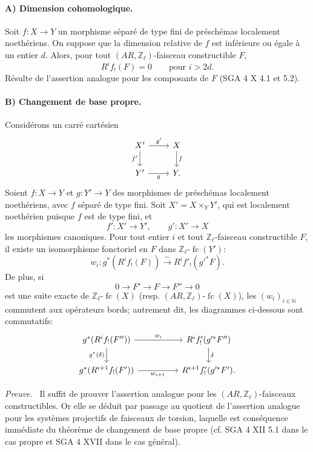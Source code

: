 \documentclass[11pt]{article}
\newenvironment{prooftext}[1][Proof]{\par\noindent\emph{#1.}\ }{\par\medskip}
\providecommand{\fc}{\operatorname{fc}}
\begin{document}
\paragraph{A) Dimension cohomologique.}
Soit \(f:X\to Y\) un morphisme séparé de type fini de préschémas localement noethériens. On suppose que la dimension relative de \(f\) est inférieure ou égale à un entier \(d\). Alors, pour tout \((AR,\mathbb Z_\ell)\)-faisceau constructible \(F\),
\[
R^if_!(F)=0\qquad\text{pour }i>2d.
\]
Résulte de l'assertion analogue pour les composants de \(F\) (SGA 4 X 4.1 et 5.2).

\paragraph{B) Changement de base propre.}
Considérons un carré cartésien
\[
\begin{tikzcd}
X' \arrow[r,"g'"] \arrow[d,"f'"'] & X \arrow[d,"f"]\\
Y' \arrow[r,"g"'] & Y .
\end{tikzcd}
\]
Soient \(f:X\to Y\) et \(g:Y'\to Y\) des morphismes de préschémas localement noethériens, avec \(f\) séparé de type fini. Soit \(X'=X\times_Y Y'\), qui est localement noethérien puisque \(f\) est de type fini, et
\[
f':X'\to Y',\qquad g':X'\to X
\]
les morphismes canoniques. Pour tout entier \(i\) et tout \(\mathbb Z_\ell\)-faisceau constructible \(F\), il existe un isomorphisme fonctoriel en \(F\) dans \(\mathbb Z_\ell\text{-}\fc(Y')\):
\[
w_i:g^*(R^if_!(F))\xrightarrow{\sim} R^if'_!(g'^*F).
\]
De plus, si
\[
0\longrightarrow F'\longrightarrow F\longrightarrow F''\longrightarrow 0
\]
est une suite exacte de \(\mathbb Z_\ell\text{-}\fc(X)\) (resp. \((AR,\mathbb Z_\ell)\text{-}\fc(X)\)), les \((w_i)_{i\in\mathbb N}\) commutent aux opérateurs bords; autrement dit, les diagrammes ci-dessous sont commutatifs:
\[
\begin{tikzcd}[column sep=huge]
g^*(R^if_!(F'')) \arrow[r,"w_i"] \arrow[d,"g^*(\delta)"']
&
R^if'_!(g'^*F'') \arrow[d,"\delta"]\\
g^*(R^{i+1}f_!(F')) \arrow[r,"w_{i+1}"']
&
R^{i+1}f'_!(g'^*F').
\end{tikzcd}
\]

\begin{prooftext}[Preuve]
Il suffit de prouver l'assertion analogue pour les \((AR,\mathbb Z_\ell)\)-faisceaux constructibles. Or elle se déduit par passage au quotient de l'assertion analogue pour les systèmes projectifs de faisceaux de torsion, laquelle est conséquence immédiate du théorème de changement de base propre (cf. SGA 4 XII 5.1 dans le cas propre et SGA 4 XVII dans le cas général).
\end{prooftext}
\end{document}

